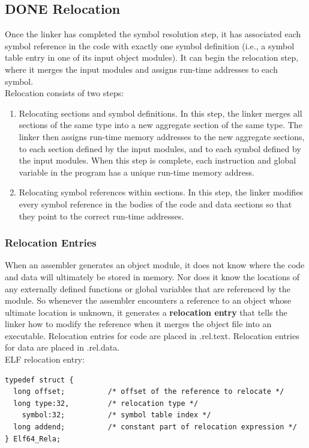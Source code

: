 \documentclass[11pt]{article}
\begin{document}
\subsection{{\bfseries\sffamily DONE} Relocation}
\label{sec:orgc5beef5}
Once the linker has completed the symbol resolution step, it has associated each symbol reference in the code with exactly one symbol definition (i.e., a symbol table entry in one of its input object modules). It can begin the relocation step, where it merges the input modules and assigns run-time addresses to each symbol.\\

Relocation consists of two steps:\\
\begin{enumerate}
\item Relocating sections and symbol definitions.  In this step, the linker merges all sections of the same type into a new aggregate section of the same type. The linker then assigns run-time memory addresses to the new aggregate sections, to each section defined by the input modules, and to each symbol defined by the input modules. When this step is complete, each instruction and global variable in the program has a unique run-time memory address.\\
\item Relocating symbol references within sections. In this step, the linker modifies every symbol reference in the bodies of the code and data sections so that they point to the correct run-time addresses.\\
\end{enumerate}


\subsubsection{Relocation Entries}
\label{sec:orga787187}
When an assembler generates an object module, it does not know where the code and data will ultimately be stored in memory. Nor does it know the locations of any externally defined functions or global variables that are referenced by the module. So whenever the assembler encounters a reference to an object whose ultimate location is unknown, it generates a \textbf{relocation entry} that tells the linker how to modify the reference when it merges the object file into an executable. Relocation entries for code are placed in .rel.text. Relocation entries for data are placed in .rel.data.\\

ELF relocation entry:\\
\begin{verbatim}
typedef struct {
  long offset;			/* offset of the reference to relocate */
  long type:32,			/* relocation type */
    symbol:32;			/* symbol table index */
  long addend;			/* constant part of relocation expression */
} Elf64_Rela;

\end{verbatim}
\end{document}

